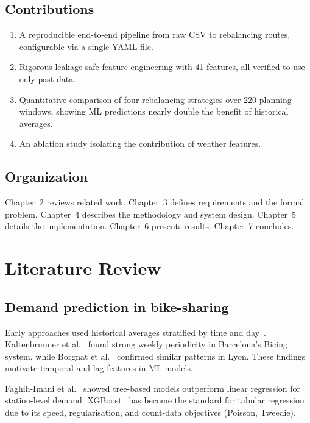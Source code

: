 \documentclass[12pt,a4paper]{report}
\begin{document}
\section{Contributions}

\begin{enumerate}
  \item A reproducible end-to-end pipeline from raw CSV to
        rebalancing routes, configurable via a single YAML file.
  \item Rigorous leakage-safe feature engineering with 41 features,
        all verified to use only past data.
  \item Quantitative comparison of four rebalancing strategies over
        220 planning windows, showing ML predictions nearly double
        the benefit of historical averages.
  \item An ablation study isolating the contribution of weather
        features.
\end{enumerate}

\section{Organization}

Chapter~2 reviews related work. Chapter~3 defines requirements and
the formal problem. Chapter~4 describes the methodology and system
design. Chapter~5 details the implementation. Chapter~6 presents
results. Chapter~7 concludes.

\chapter{Literature Review}

\section{Demand prediction in bike-sharing}

Early approaches used historical averages stratified by time and
day~\cite{froehlich2009}. Kaltenbrunner et al.~\cite{kaltenbrunner2010}
found strong weekly periodicity in Barcelona's Bicing system, while
Borgnat et al.~\cite{borgnat2011} confirmed similar patterns in Lyon.
These findings motivate temporal and lag features in ML models.

Faghih-Imani et al.~\cite{faghih2014} showed tree-based models
outperform linear regression for station-level demand. XGBoost~\cite{chen2016xgboost}
has become the standard for tabular regression due to its speed,
regularisation, and count-data objectives (Poisson, Tweedie).
\end{document}
